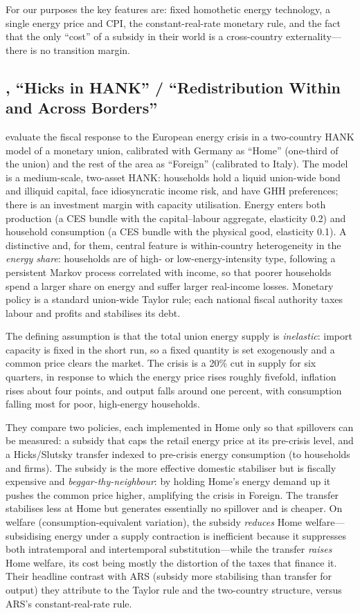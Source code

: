 \documentclass[11pt,a4paper]{article}
\begin{document}
For our purposes the key features are: fixed homothetic energy technology, a
single energy price and CPI, the constant-real-rate monetary rule, and the fact
that the only ``cost'' of a subsidy in their world is a cross-country
externality---there is no transition margin.

\subsection{\citet{Bayer2026}, ``Hicks in HANK'' / ``Redistribution Within and
Across Borders''}

\citet{Bayer2026} evaluate the fiscal response to the European energy crisis in
a two-country HANK model of a monetary union, calibrated with Germany as
``Home'' (one-third of the union) and the rest of the area as ``Foreign''
(calibrated to Italy). The model is a medium-scale, two-asset HANK: households
hold a liquid union-wide bond and illiquid capital, face idiosyncratic income
risk, and have GHH preferences; there is an investment margin with capacity
utilisation. Energy enters both production (a CES bundle with the
capital--labour aggregate, elasticity 0.2) and household consumption (a CES
bundle with the physical good, elasticity 0.1). A distinctive and, for them,
central feature is within-country heterogeneity in the \emph{energy share}:
households are of high- or low-energy-intensity type, following a persistent
Markov process correlated with income, so that poorer households spend a larger
share on energy and suffer larger real-income losses. Monetary policy is a
standard union-wide Taylor rule; each national fiscal authority taxes labour
and profits and stabilises its debt.

The defining assumption is that the total union energy supply is
\emph{inelastic}: import capacity is fixed in the short run, so a fixed quantity
is set exogenously and a common price clears the market. The crisis is a 20\%
cut in supply for six quarters, in response to which the energy price rises
roughly fivefold, inflation rises about four points, and output falls around
one percent, with consumption falling most for poor, high-energy households.

They compare two policies, each implemented in Home only so that spillovers can
be measured: a subsidy that caps the retail energy price at its pre-crisis
level, and a Hicks/Slutsky transfer indexed to pre-crisis energy consumption
(to households and firms). The subsidy is the more effective domestic
stabiliser but is fiscally expensive and \emph{beggar-thy-neighbour}: by
holding Home's energy demand up it pushes the common price higher, amplifying
the crisis in Foreign. The transfer stabilises less at Home but generates
essentially no spillover and is cheaper. On welfare (consumption-equivalent
variation), the subsidy \emph{reduces} Home welfare---subsidising energy under a
supply contraction is inefficient because it suppresses both intratemporal and
intertemporal substitution---while the transfer \emph{raises} Home welfare, its
cost being mostly the distortion of the taxes that finance it. Their headline
contrast with ARS (subsidy more stabilising than transfer for output) they
attribute to the Taylor rule and the two-country structure, versus ARS's
constant-real-rate rule.
\end{document}
